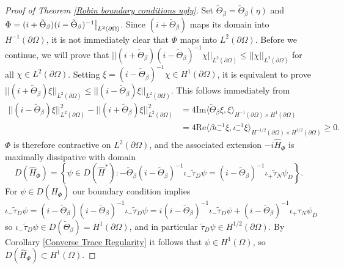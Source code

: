 \documentclass{article}
\numberwithin{equation}{section}
\begin{document}
    \begin{proof}[Proof of Theorem \ref{Robin boundary conditions ugly}]
        Set $\tilde{\Theta}_\beta=\tilde{\Theta}_\beta(\eta)$ and $\Phi=(i + \tilde{\Theta}_\beta)(i-\tilde{\Theta}_\beta)^{-1}\big{|}_{L^2(\partial \Omega)}$. Since $(i+\tilde{\Theta}_\beta)$ maps its domain into $H^{-1}(\partial \Omega)$, it is not immediately clear that $\Phi$ maps into $L^2(\partial \Omega)$. Before we continue, we will prove that $||(i+\tilde{\Theta}_\beta)(i-\tilde{\Theta}_\beta)^{-1}\chi||_{L^2(\partial \Omega)}\leq ||\chi||_{L^2(\partial \Omega)}$ for all $\chi \in L^{2}(\partial \Omega)$. Setting $\xi=(i-\tilde{\Theta}_\beta)^{-1}\chi\in H^1(\partial \Omega)$, it is equivalent to prove $||(i+\tilde{\Theta}_\beta)\xi||_{L^2(\partial \Omega)}\leq ||(i-\tilde{\Theta}_\beta)\xi||_{L^2(\partial \Omega)}$. This follows immediately from
    \begin{equation}\label{contraction}
    \begin{split}
        ||(i-\tilde{\Theta}_\beta)\xi||_{L^2(\partial \Omega)}^2-||(i+\tilde{\Theta}_\beta)\xi||_{L^2(\partial \Omega)}^2&=4\text{Im}\langle \tilde{\Theta}_\beta \xi, \xi \rangle_{H^{-1}(\partial \Omega)\times H^{1}(\partial \Omega)}
        \\
        &=4\text{Re}\langle \beta\iota_-^{-1}\xi, \iota_-^{-1}\xi\rangle_{H^{-1/2}(\partial \Omega)\times H^{1/2}(\partial \Omega)}\geq 0.
    \end{split}
    \end{equation}
    $\Phi$ is therefore contractive on $L^2(\partial \Omega)$, and the associated extension $-i\hat{H}_\Phi$ is maximally dissipative with domain
    \begin{equation}\label{H Phi bad def}
        D(\hat{H}_\Phi)= \left\{\psi \in D(\hat{H}^*): -\tilde{\Theta}_\beta (i- \tilde{\Theta}_\beta)^{-1}\iota_-\tilde{\tau}_D \psi=(i - \tilde{\Theta}_\beta)^{-1}\iota_+ \tilde{\tau}_N \psi_D \right\}.
    \end{equation}
    For $\psi \in D(\hat{H}_\Phi)$ our boundary condition implies
    \begin{equation}
    \iota_- \tilde{\tau}_D \psi=(i-\tilde{\Theta}_\beta)(i-\tilde{\Theta}_\beta)^{-1}\iota_-\tilde{\tau}_D\psi=i(i-\tilde{\Theta}_\beta)^{-1}\iota_-\tilde{\tau}_D\psi +(i-\tilde{\Theta}_\beta)^{-1}\iota_+\tau_N \psi_D
    \end{equation}
    so $\iota_- \tilde{\tau}_D \psi \in D(\tilde{\Theta}_\beta)=H^1(\partial \Omega)$, and in particular $\tilde{\tau}_D \psi \in H^{1/2}(\partial \Omega)$. By Corollary \ref{Converse Trace Regularity} it follows that $\psi \in H^1(\Omega)$, so $D(\hat{H}_\Phi)\subset H^1(\Omega)$.
    

\end{proof}
\end{document}
